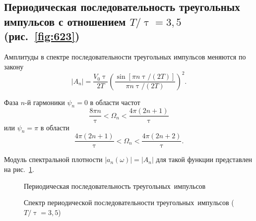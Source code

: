 \subsection*{Периодическая последовательность треугольных импульсов с отношением $T/\uptau=3{,}5$ (рис.~\ref{fig:623})}

Амплитуды в спектре последовательности треугольных импульсов меняются по закону
\begin{equation}
	|A_n|=\frac{V_0\uptau}{2T} \left(\frac{\sin[\pi n\uptau/(2T)]} {\pi n\uptau/(2T)}\right)^2.
	\label{eq:623}
\end{equation}

Фаза $n$-й гармоники $\psi_n=0$ в области частот
\begin{equation}
	\frac{8\pi n}{\uptau}<\Omega_n<\frac{4\pi (2n+1)}{\uptau}
	\label{eq:624}
\end{equation}
или $\psi_n=\pi$ в области
\begin{equation}
	\frac{4\pi(2n+1)}{\uptau}<\Omega_n<\frac{4\pi(2n+2)}{\uptau}.
	\label{eq:624'}
\end{equation}

Модуль спектральной плотности $|a_n(\omega)|=|A_n|$ для такой функции представлен на рис.~\ref{fig:624}.

\begin{figure}[t]
\begin{minipage}{0.45\textwidth}
	\caption{Периодическая последовательность треугольных~импульсов}
	\label{fig:623}
\end{minipage}
\hfill
\begin{minipage}{0.45\textwidth}
	\caption{Спектр периодической последовательности треугольных~импульсов ($T/\uptau=3,5$)}
	\label{fig:624}
\end{minipage}
\end{figure}


